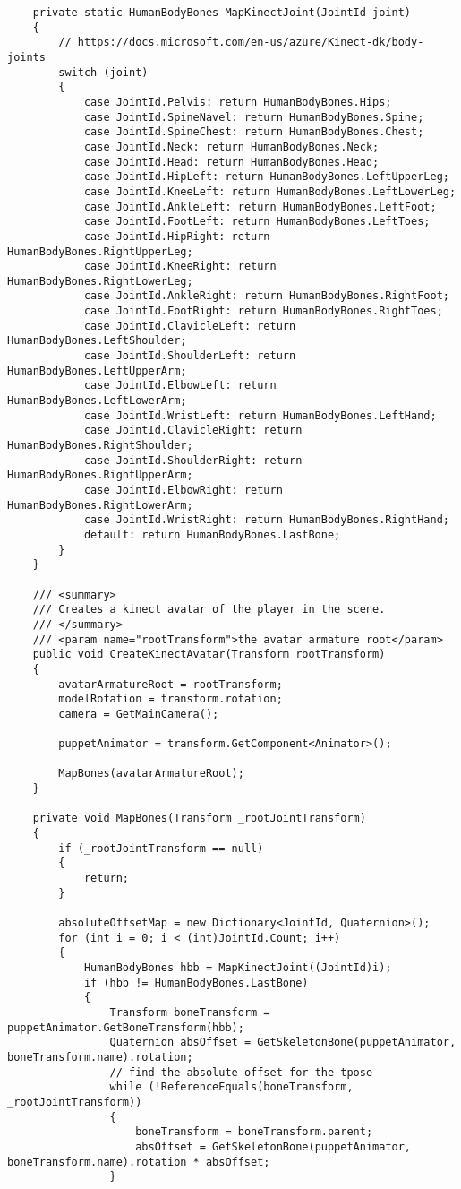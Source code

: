 \begin{verbatim}
    private static HumanBodyBones MapKinectJoint(JointId joint)
    {
        // https://docs.microsoft.com/en-us/azure/Kinect-dk/body-joints
        switch (joint)
        {
            case JointId.Pelvis: return HumanBodyBones.Hips;
            case JointId.SpineNavel: return HumanBodyBones.Spine;
            case JointId.SpineChest: return HumanBodyBones.Chest;
            case JointId.Neck: return HumanBodyBones.Neck;
            case JointId.Head: return HumanBodyBones.Head;
            case JointId.HipLeft: return HumanBodyBones.LeftUpperLeg;
            case JointId.KneeLeft: return HumanBodyBones.LeftLowerLeg;
            case JointId.AnkleLeft: return HumanBodyBones.LeftFoot;
            case JointId.FootLeft: return HumanBodyBones.LeftToes;
            case JointId.HipRight: return HumanBodyBones.RightUpperLeg;
            case JointId.KneeRight: return HumanBodyBones.RightLowerLeg;
            case JointId.AnkleRight: return HumanBodyBones.RightFoot;
            case JointId.FootRight: return HumanBodyBones.RightToes;
            case JointId.ClavicleLeft: return HumanBodyBones.LeftShoulder;
            case JointId.ShoulderLeft: return HumanBodyBones.LeftUpperArm;
            case JointId.ElbowLeft: return HumanBodyBones.LeftLowerArm;
            case JointId.WristLeft: return HumanBodyBones.LeftHand;
            case JointId.ClavicleRight: return HumanBodyBones.RightShoulder;
            case JointId.ShoulderRight: return HumanBodyBones.RightUpperArm;
            case JointId.ElbowRight: return HumanBodyBones.RightLowerArm;
            case JointId.WristRight: return HumanBodyBones.RightHand;
            default: return HumanBodyBones.LastBone;
        }
    }

    /// <summary>
    /// Creates a kinect avatar of the player in the scene.
    /// </summary>
    /// <param name="rootTransform">the avatar armature root</param>
    public void CreateKinectAvatar(Transform rootTransform)
    {
        avatarArmatureRoot = rootTransform;
        modelRotation = transform.rotation;
        camera = GetMainCamera();

        puppetAnimator = transform.GetComponent<Animator>();

        MapBones(avatarArmatureRoot);
    }

    private void MapBones(Transform _rootJointTransform)
    {
        if (_rootJointTransform == null)
        {
            return;
        }

        absoluteOffsetMap = new Dictionary<JointId, Quaternion>();
        for (int i = 0; i < (int)JointId.Count; i++)
        {
            HumanBodyBones hbb = MapKinectJoint((JointId)i);
            if (hbb != HumanBodyBones.LastBone)
            {
                Transform boneTransform = puppetAnimator.GetBoneTransform(hbb);
                Quaternion absOffset = GetSkeletonBone(puppetAnimator, boneTransform.name).rotation;
                // find the absolute offset for the tpose
                while (!ReferenceEquals(boneTransform, _rootJointTransform))
                {
                    boneTransform = boneTransform.parent;
                    absOffset = GetSkeletonBone(puppetAnimator, boneTransform.name).rotation * absOffset;
                }


\end{verbatim}
